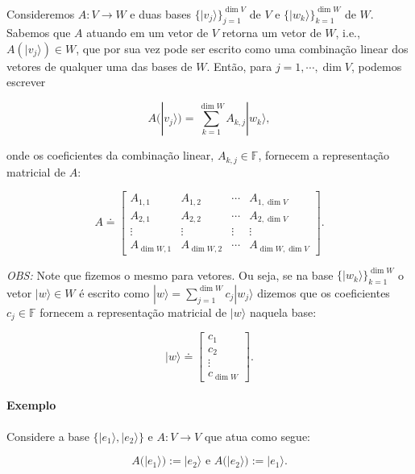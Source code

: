 \documentclass[11pt]{article}
\begin{document}
Consideremos \(A:V\rightarrow W\) e duas bases
\(\{|v_{j}\rangle\}_{j=1}^{\dim V}\) de \(V\) e
\(\{|w_{k}\rangle\}_{k=1}^{\dim W}\) de \(W\). Sabemos que \(A\) atuando
em um vetor de \(V\) retorna um vetor de \(W\), i.e.,
\(A(|v_{j}\rangle)\in W\), que por sua vez pode ser escrito como uma
combinação linear dos vetores de qualquer uma das bases de \(W\). Então,
para \(j=1,\cdots,\dim V\), podemos escrever

\begin{equation}
A(|v_{j}\rangle) = \sum_{k=1}^{\dim W}A_{k,j}|w_{k}\rangle,
\end{equation}

onde os coeficientes da combinação linear, \(A_{k,j}\in\mathbb{F}\),
fornecem a representação matricial de \(A\):

\begin{equation}
A \doteq \begin{bmatrix} A_{1,1} & A_{1,2} & \cdots & A_{1,\dim V} \\ 
A_{2,1} & A_{2,2} & \cdots & A_{2,\dim V} \\ 
\vdots & \vdots & \vdots & \vdots 
\\ A_{\dim W,1} & A_{\dim W,2} & \cdots & A_{\dim W,\dim V} \end{bmatrix}.
\end{equation}

\emph{OBS:} Note que fizemos o mesmo para vetores. Ou seja, se na base
\(\{|w_{k}\rangle\}_{k=1}^{\dim W}\) o vetor \(|w\rangle\in W\) é
escrito como \(|w\rangle=\sum_{j=1}^{\dim W}c_{j}|w_{j}\rangle\) dizemos
que os coeficientes \(c_{j}\in\mathbb{F}\) fornecem a representação
matricial de \(|w\rangle\) naquela base:

\begin{equation}
|w\rangle \doteq \begin{bmatrix} c_{1} \\ c_{2} \\ \vdots \\ c_{\dim W} \end{bmatrix}.
\end{equation}

\paragraph{Exemplo}\label{exemplo}

Considere a base \(\{|e_{1}\rangle,|e_{2}\rangle\}\) e
\(A:V\rightarrow V\) que atua como segue:

\begin{equation}
A(|e_{1}\rangle):=|e_{2}\rangle \text{ e } A(|e_{2}\rangle):=|e_{1}\rangle.
\end{equation}
\end{document}

